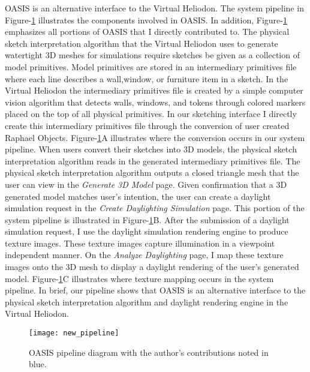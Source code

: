 			OASIS is an alternative interface to the Virtual Heliodon. 
			The system pipeline in Figure-\ref{fig:new_pipeline} illustrates the components involved in OASIS.
			In addition, Figure-\ref{fig:new_pipeline} emphasizes all portions of OASIS that I directly contributed to.
			The physical sketch interpretation algorithm that the Virtual Heliodon uses to generate watertight 3D meshes for simulations require sketches be given as a collection of model primitives. 
			Model primitives are stored in an intermediary primitives file where each line describes a wall,window, or furniture item in a sketch.
			In the Virtual Heliodon the intermediary primitives file is created by a simple computer vision algorithm that detects walls, windows, and tokens through colored markers placed on the top of all physical primitives.
			In our sketching interface I directly create this intermediary primitives file through the conversion of user created Raphael Objects.
			Figure-\ref{fig:new_pipeline}A illustrates where the conversion occurs in our system pipeline.
			When users convert their sketches into 3D models, the physical sketch interpretation algorithm reads in the generated intermediary primitives file.
			The physical sketch interpretation algorithm outputs a closed triangle mesh that the user can view in the \textit{Generate 3D Model} page.
			Given confirmation that a 3D generated model matches user's intention, the user can create a daylight simulation request in the \textit{Create Daylighting Simulation} page.
			This portion of the system pipeline is illustrated in Figure-\ref{fig:new_pipeline}B.
			After the submission of a daylight simulation request, I use the daylight simulation rendering engine to produce texture images.
			These texture images capture illumination in a viewpoint independent manner.
			On the \textit{Analyze Daylighting} page, I map these texture images onto the 3D mesh to display a daylight rendering of the user's generated model.
			Figure-\ref{fig:new_pipeline}C illustrates where texture mapping occurs in the system pipeline.
			In brief, our pipeline shows that OASIS is an alternative interface to the physical sketch interpretation algorithm and daylight rendering engine in the Virtual Heliodon.

			\begin{figure}[h]
			\centering
			\texttt{[image: new\_pipeline]}
			\caption{OASIS pipeline diagram with the author's contributions noted in blue.}
			\label{fig:new_pipeline}
			\end{figure}

